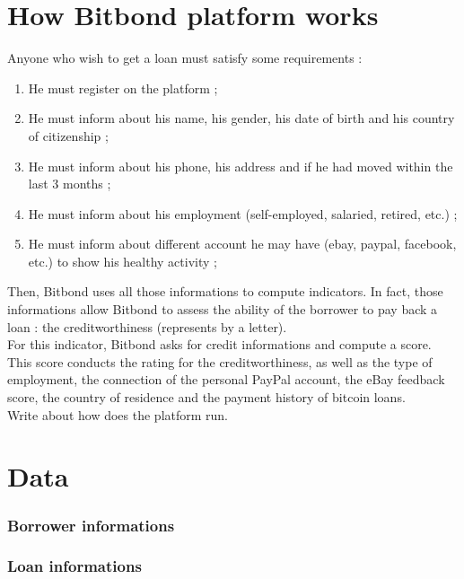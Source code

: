 \documentclass[a4paper,12pt]{article}
\begin{document}
	\section{How Bitbond platform works}
		Anyone who wish to get a loan must satisfy some requirements :
		\begin{enumerate}
			\item He must register on the platform ;
			\item He must inform about his name, his gender, his date of birth and his country of citizenship ;
			\item He must inform about his phone, his address and if he had moved within the last 3 months ;
			\item He must inform about his employment (self-employed, salaried, retired, etc.) ;
			\item He must inform about different account he may have (ebay, paypal, facebook, etc.) to show his healthy activity ;
		\end{enumerate}
		Then, Bitbond uses all those informations to compute indicators. In fact, those informations allow Bitbond to assess the ability of the borrower to pay back a loan : the creditworthiness (represents by a letter).\\
		For this indicator, Bitbond asks for credit informations and compute a score. This score conducts the rating for the creditworthiness, as well as the type of employment, the connection of the personal PayPal account, the eBay feedback score, the country of residence and the payment history of bitcoin loans.\\

		Write about how does the platform run.

	\section{Data}
		\subsubsection{Borrower informations} %
		\label{ssub:borrower_informations}



		\subsubsection{Loan informations} %
		\label{ssub:loan_informations}
\end{document}
